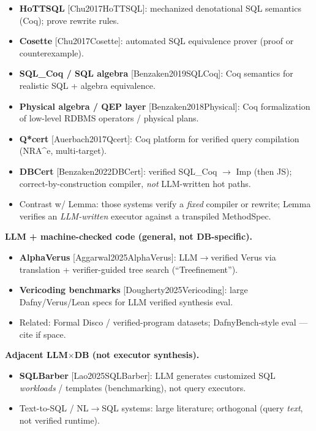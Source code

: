 \documentclass[
  10pt,
]{article}
\providecommand{\tightlist}{%
  \setlength{\itemsep}{0pt}\setlength{\parskip}{0pt}}
\begin{document}
\begin{itemize}
\tightlist
\item
  \textbf{HoTTSQL} {[}Chu2017HoTTSQL{]}: mechanized denotational SQL
  semantics (Coq); prove rewrite rules.
\item
  \textbf{Cosette} {[}Chu2017Cosette{]}: automated SQL equivalence
  prover (proof or counterexample).
\item
  \textbf{SQL\_Coq / SQL algebra} {[}Benzaken2019SQLCoq{]}: Coq
  semantics for realistic SQL + algebra equivalence.
\item
  \textbf{Physical algebra / QEP layer} {[}Benzaken2018Physical{]}: Coq
  formalization of low-level RDBMS operators / physical plans.
\item
  \textbf{Q*cert} {[}Auerbach2017Qcert{]}: Coq platform for verified
  query compilation (NRA\^{}e, multi-target).
\item
  \textbf{DBCert} {[}Benzaken2022DBCert{]}: verified SQL\_Coq \ensuremath{\rightarrow} Imp
  (then JS); correct-by-construction compiler, \emph{not} LLM-written
  hot paths.
\item
  Contrast w/ Lemma: those systems verify a \emph{fixed} compiler or
  rewrite; Lemma verifies an \emph{LLM-written} executor against a
  transpiled MethodSpec.
\end{itemize}

\textbf{LLM + machine-checked code (general, not DB-specific).}

\begin{itemize}
\tightlist
\item
  \textbf{AlphaVerus} {[}Aggarwal2025AlphaVerus{]}: LLM\ensuremath{\rightarrow}verified Verus
  via translation + verifier-guided tree search (``Treefinement'').
\item
  \textbf{Vericoding benchmarks} {[}Dougherty2025Vericoding{]}: large
  Dafny/Verus/Lean specs for LLM verified synthesis eval.
\item
  Related: Formal Disco / verified-program datasets; DafnyBench-style
  eval --- cite if space.
\end{itemize}

\textbf{Adjacent LLM\ensuremath{\times}DB (not executor synthesis).}

\begin{itemize}
\tightlist
\item
  \textbf{SQLBarber} {[}Lao2025SQLBarber{]}: LLM generates customized
  SQL \emph{workloads} / templates (benchmarking), not query executors.
\item
  Text-to-SQL / NL\ensuremath{\rightarrow}SQL systems: large literature; orthogonal (query
  \emph{text}, not verified runtime).
\end{itemize}
\end{document}
